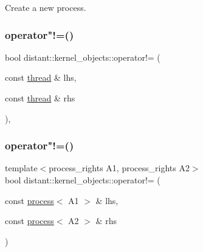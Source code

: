 Create a new process. 

\mbox{\label{namespacedistant_1_1kernel__objects_aafd262e02cb9a8ef360e55bdb6b05704}} 
\subsubsection{\texorpdfstring{operator"!=()}{operator!=()}\hspace{0.1cm}{\footnotesize\ttfamily [1/3]}}
{\footnotesize\ttfamily bool distant\+::kernel\+\_\+objects\+::operator!= (\begin{DoxyParamCaption}\item[{const \mbox{\hyperlink{classdistant_1_1kernel__objects_1_1thread}{thread}} \&}]{lhs,  }\item[{const \mbox{\hyperlink{classdistant_1_1kernel__objects_1_1thread}{thread}} \&}]{rhs }\end{DoxyParamCaption})\hspace{0.3cm}{\ttfamily [inline]}, {\ttfamily [noexcept]}}

\mbox{\label{namespacedistant_1_1kernel__objects_a0039fde5cf2f6b4e5d863a45b835c0e8}} 
\subsubsection{\texorpdfstring{operator"!=()}{operator!=()}\hspace{0.1cm}{\footnotesize\ttfamily [2/3]}}
{\footnotesize\ttfamily template$<$process\+\_\+rights A1, process\+\_\+rights A2$>$ \\
bool distant\+::kernel\+\_\+objects\+::operator!= (\begin{DoxyParamCaption}\item[{const \mbox{\hyperlink{classdistant_1_1kernel__objects_1_1process}{process}}$<$ A1 $>$ \&}]{lhs,  }\item[{const \mbox{\hyperlink{classdistant_1_1kernel__objects_1_1process}{process}}$<$ A2 $>$ \&}]{rhs }\end{DoxyParamCaption})\hspace{0.3cm}{\ttfamily [noexcept]}}


